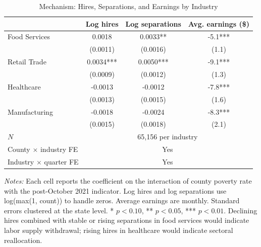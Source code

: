 \begin{table}[H]
\centering
\caption{Mechanism: Hires, Separations, and Earnings by Industry}
\label{tab:mechanism}
\begin{threeparttable}
\begin{tabular}{lccc}
\toprule
 & Log hires & Log separations & Avg. earnings (\$) \\
\midrule
Food Services & 0.0018 & 0.0033** & -5.1*** \\
 & (0.0011) & (0.0016) & (1.1) \\
Retail Trade & 0.0034*** & 0.0050*** & -9.1*** \\
 & (0.0009) & (0.0012) & (1.3) \\
Healthcare & -0.0013 & -0.0012 & -7.8*** \\
 & (0.0013) & (0.0015) & (1.6) \\
Manufacturing & -0.0018 & -0.0024 & -8.3*** \\
 & (0.0015) & (0.0018) & (2.1) \\
\midrule
$N$ & \multicolumn{3}{c}{65,156 per industry} \\
County $\times$ industry FE & \multicolumn{3}{c}{Yes} \\
Industry $\times$ quarter FE & \multicolumn{3}{c}{Yes} \\
\bottomrule
\end{tabular}
\begin{tablenotes}[flushleft]
\small
\item \textit{Notes:} Each cell reports the coefficient on the interaction of county poverty rate with the post-October 2021 indicator. Log hires and log separations use log(max(1, count)) to handle zeros. Average earnings are monthly. Standard errors clustered at the state level. * $p<0.10$, ** $p<0.05$, *** $p<0.01$. Declining hires combined with stable or rising separations in food services would indicate labor supply withdrawal; rising hires in healthcare would indicate sectoral reallocation.
\end{tablenotes}
\end{threeparttable}
\end{table}
